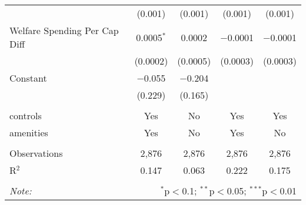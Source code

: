\begin{table}[!htbp]
\begin{tabular}{@{\extracolsep{5pt}}lcccc}
  & (0.001) & (0.001) & (0.001) & (0.001) \\ 
  Welfare Spending Per Cap Diff & 0.0005$^{*}$ & 0.0002 & $-$0.0001 & $-$0.0001 \\ 
  & (0.0002) & (0.0005) & (0.0003) & (0.0003) \\ 
  Constant & $-$0.055 & $-$0.204 &  &  \\ 
  & (0.229) & (0.165) &  &  \\ 
 \hline \\[-1.8ex] 
controls & Yes & No & Yes & Yes \\ 
amenities & Yes & No & Yes & No \\ 
\hline \\[-1.8ex] 
Observations & 2,876 & 2,876 & 2,876 & 2,876 \\ 
R$^{2}$ & 0.147 & 0.063 & 0.222 & 0.175 \\ 
\hline 
\hline \\[-1.8ex] 
\textit{Note:}  & \multicolumn{4}{r}{$^{*}$p$<$0.1; $^{**}$p$<$0.05; $^{***}$p$<$0.01} \\ 
\end{tabular} 
\end{table} 
